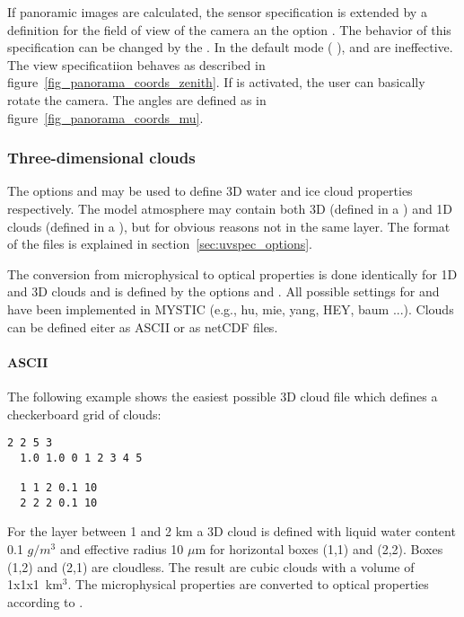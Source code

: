 {If panoramic images are calculated, the sensor specification is extended by a definition for the field of view of the camera an the option .
The behavior of this specification can be changed by the .
In the default mode ( ),  and  are ineffective.
The view specificatiion behaves as described in figure~\ref{fig_panorama_coords_zenith}.
If   is activated, the user can basically rotate the camera.
The angles are defined as in figure~\ref{fig_panorama_coords_mu}.

\subsubsection{Three-dimensional clouds}

The options 
and  may be used to define 3D water and ice
cloud properties respectively. The model atmosphere may contain both 3D 
(defined in a ) and 1D clouds (defined in a 
), but for obvious reasons not in the same layer. The format
of the files is explained in section~\ref{sec:uvspec_options}. 

The conversion from microphysical to optical properties 
is done identically for 1D and 3D clouds and is defined 
by the options  and . All
possible settings for  and 
have been implemented in MYSTIC (e.g., hu, mie, yang, HEY, baum ...).
Clouds can be defined eiter as ASCII or as netCDF files.

\paragraph{ASCII}
The following example shows the easiest possible 3D 
cloud file which defines a checkerboard grid of clouds:
\begin{Verbatim}[fontsize=\footnotesize, frame=single, samepage=true]
  2 2 5 3
  1.0 1.0 0 1 2 3 4 5 

  1 1 2 0.1 10
  2 2 2 0.1 10
\end{Verbatim}
For the layer between 1 and 2 km a 3D cloud is defined with liquid water
content 0.1 $g/m^3$ and effective radius 10 $\mu$m for horizontal 
boxes (1,1) and (2,2). Boxes (1,2) and (2,1) are cloudless. The result are
cubic clouds with a volume of 1x1x1~km$^3$. The microphysical properties are
converted to optical properties according to .  

}
